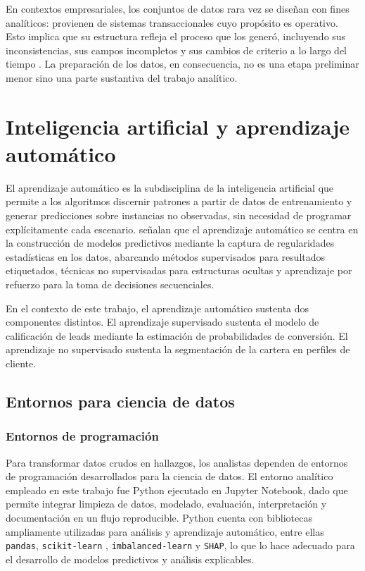 En contextos empresariales, los conjuntos de datos rara vez se diseñan con fines
analíticos: provienen de sistemas transaccionales cuyo propósito es operativo. Esto
implica que su estructura refleja el proceso que los generó, incluyendo sus
inconsistencias, sus campos incompletos y sus cambios de criterio a lo largo del
tiempo \cite{berry2004data, blattberg2008database}. La preparación de los datos,
en consecuencia, no es una etapa preliminar menor sino una parte sustantiva del
trabajo analítico.

\section{Inteligencia artificial y aprendizaje automático}

El aprendizaje automático es la subdisciplina de la inteligencia artificial que
permite a los algoritmos discernir patrones a partir de datos de entrenamiento y
generar predicciones sobre instancias no observadas, sin necesidad de programar
explícitamente cada escenario.  señalan que el aprendizaje
automático se centra en la construcción de modelos predictivos mediante la captura
de regularidades estadísticas en los datos, abarcando métodos supervisados para
resultados etiquetados, técnicas no supervisadas para estructuras ocultas y
aprendizaje por refuerzo para la toma de decisiones secuenciales.

En el contexto de este trabajo, el aprendizaje automático sustenta dos componentes
distintos. El aprendizaje supervisado sustenta el modelo de calificación
de leads mediante la estimación de probabilidades de conversión. El aprendizaje
no supervisado sustenta la segmentación de la cartera en perfiles de cliente.

\subsection{Entornos para ciencia de datos}

\subsubsection{Entornos de programación}

Para transformar datos crudos en hallazgos, los analistas dependen de entornos de
programación desarrollados para la ciencia de datos. El entorno analítico empleado
en este trabajo fue Python \cite{python_about} ejecutado en Jupyter Notebook, dado
que permite integrar limpieza de datos, modelado, evaluación, interpretación y
documentación en un flujo reproducible. Python cuenta con bibliotecas ampliamente
utilizadas para análisis y aprendizaje automático, entre ellas \texttt{pandas},
\texttt{scikit-learn} \cite{pedregosa2011scikit}, \texttt{imbalanced-learn} y
\texttt{SHAP}, lo que lo hace adecuado para el desarrollo de modelos predictivos y
análisis explicables.

